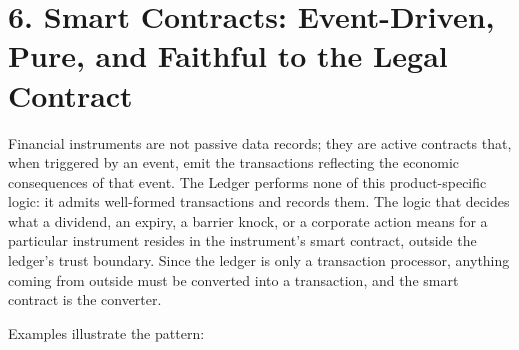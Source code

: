 \documentclass[11pt,a4paper]{article}
\begin{document}
\hypertarget{smart-contracts-event-driven-pure-and-faithful-to-the-legal-contract}{%
\section{6. Smart Contracts: Event-Driven, Pure, and Faithful to the
Legal
Contract}\label{smart-contracts-event-driven-pure-and-faithful-to-the-legal-contract}}

Financial instruments are not passive data records; they are active
contracts that, when triggered by an event, emit the transactions
reflecting the economic consequences of that event. The Ledger performs
none of this product-specific logic: it admits well-formed transactions
and records them. The logic that decides what a dividend, an expiry, a
barrier knock, or a corporate action means for a particular instrument
resides in the instrument's smart contract, outside the ledger's trust
boundary. Since the ledger is only a transaction processor, anything
coming from outside must be converted into a transaction, and the smart
contract is the converter.

Examples illustrate the pattern:
\end{document}

